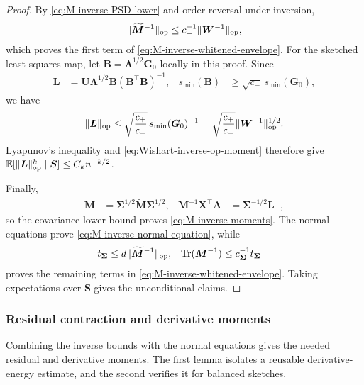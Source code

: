\documentclass{article}
\theoremstyle{plain}
\theoremstyle{definition}
\theoremstyle{definition}
\DeclarePairedDelimiter\norm{\lVert}{\rVert}
\DeclareMathOperator{\trace}{Tr}
\def\E{{\mathbb{E}}}
\def\mathbold{\boldsymbol}
\def\cal{\mathcal}
\def\bA{\mathbold{A}}\def\calA{{\cal A}}\def\scrA{{\mathscr A}}\def\Ahat{\widehat{A}}\def\Atil{{\widetilde A}}
\def\bB{\mathbold{B}}\def\calB{{\cal B}}\def\scrB{{\mathscr B}}\def\Bhat{\widehat{B}}\def\Btil{{\widetilde B}}
\def\bG{\mathbold{G}}\def\calG{{\cal G}}\def\scrG{{\mathscr G}}\def\Ghat{\widehat{G}}\def\Gtil{{\widetilde G}}
\def\bL{\mathbold{L}}\def\hbL{{\widehat{\bL}}}\def\tbL{{\widetilde{\bL}}}
\def\bM{\mathbold{M}}\def\hbM{{\widehat{\bM}}}\def\tbM{{\widetilde{\bM}}}
\def\bS{\mathbold{S}}\def\hbS{{\widehat{\bS}}}\def\tbS{{\widetilde{\bS}}}
\def\bU{\mathbold{U}}\def\hbU{{\widehat{\bU}}}\def\tbU{{\widetilde{\bU}}}
\def\bW{\mathbold{W}}\def\hbW{{\widehat{\bW}}}\def\tbW{{\widetilde{\bW}}}
\def\bX{\mathbold{X}}\def\hbX{{\widehat{\bX}}}\def\tbX{{\tilde{\bX}}}\def\bXbar{{\overline \bX}}
\def\bLambda{\mathbold{\Lambda}}\def\hbLambda{{\widehat{\bLambda}}}
\def\bSigma{\mathbold{\Sigma}}\def\hbSigma{{\widehat{\bSigma}}}
\begin{document}
\begin{proof}
By \eqref{eq:M-inverse-PSD-lower} and order reversal under inversion,
\begin{align*}
    \norm{\widetilde{\bM}^{-1}}_{\rm op}
    \leq c_-^{-1}\norm{\bW^{-1}}_{\rm op},
\end{align*}
which proves the first term of
\eqref{eq:M-inverse-whitened-envelope}.  For the sketched least-squares map,
let $\bB=\bLambda^{1/2}\bG_0$ locally in this proof. Since
\begin{align*}
    \bL
    &=\bU\bLambda^{1/2}\bB(\bB^\top\bB)^{-1},
    &
    s_{\min}(\bB)&\geq\sqrt{c_-}\,s_{\min}(\bG_0),
\end{align*}
we have
\begin{align*}
    \norm{\bL}_{\rm op}
    \leq\sqrt{\frac{c_+}{c_-}}\,
       s_{\min}(\bG_0)^{-1}
    =\sqrt{\frac{c_+}{c_-}}
       \norm{\bW^{-1}}_{\rm op}^{1/2}.
\end{align*}
Lyapunov's inequality and \eqref{eq:Wishart-inverse-op-moment} therefore give
$\E[\norm{\bL}_{\rm op}^k\mid\bS]\leq C_kn^{-k/2}$.

Finally,
\begin{align*}
    \bM
    &=\bSigma^{1/2}\widetilde{\bM}\bSigma^{1/2},
    &
    \bM^{-1}\bX^\top\bA
    &=\bSigma^{-1/2}\bL^\top,
\end{align*}
so the covariance lower bound proves \eqref{eq:M-inverse-moments}.
The normal equations prove \eqref{eq:M-inverse-normal-equation}, while
\begin{align*}
    t_{\bSigma}
    &\leq d\norm{\widetilde{\bM}^{-1}}_{\rm op},
    &
    \trace(\bM^{-1})
    &\leq c_{\bSigma}^{-1}
       t_{\bSigma}
\end{align*}
proves the remaining terms in
\eqref{eq:M-inverse-whitened-envelope}.  Taking expectations over $\bS$
gives the unconditional claims.
\end{proof}

\subsubsection{Residual contraction and derivative moments}

Combining the inverse bounds with the normal equations gives the needed
residual and derivative moments. The first lemma isolates a reusable
derivative-energy estimate, and the second verifies it for balanced sketches.
\end{document}
